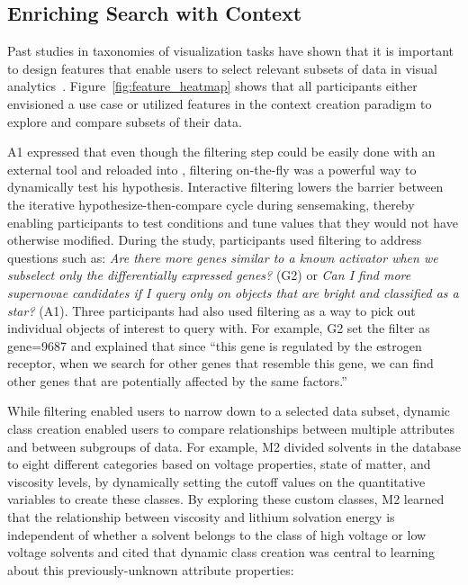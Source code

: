 \subsection{Enriching Search with Context}
\par Past studies in taxonomies of visualization tasks have shown that it is important to design features that enable users to select relevant subsets of data in visual analytics~\cite{Amar2005,Heer2012}. %
Figure~\ref{fig:feature_heatmap} shows that all participants either envisioned a use case or utilized features in the context creation paradigm to explore and compare subsets of their data.
\par A1 expressed that even though the filtering step could be easily done with an external tool and reloaded into \zv, filtering on-the-fly was a powerful way to dynamically test his hypothesis. Interactive filtering lowers the barrier between the iterative hypothesize-then-compare cycle during sensemaking, thereby enabling participants to test conditions and tune values that they would not have otherwise modified.
During the study, participants used filtering to address questions such as: \textit{Are there more genes similar to a known activator when we subselect only the differentially expressed genes?} (G2) or \textit{Can I find more supernovae candidates if I query only on objects that are bright and classified as a star?} (A1). Three participants had also used filtering as a way to pick out individual objects of interest to query with. For example, G2 set the filter as gene=9687 and explained that since ``this gene is regulated by the estrogen receptor, when we search for other genes that resemble this gene, we can find other genes that are potentially affected by the same factors.''
\par While filtering enabled users to narrow down to a selected data subset, dynamic class creation enabled users to compare relationships between multiple attributes and between subgroups of data. For example, M2 divided solvents in the database to eight different categories based on voltage properties, state of matter, and viscosity levels, by dynamically setting the cutoff values on the quantitative variables to create these classes. By exploring these custom classes, M2 learned that the relationship between viscosity and lithium solvation energy is independent of whether a solvent belongs to the class of high voltage or low voltage solvents and cited that dynamic class creation was central to learning about this previously-unknown attribute properties:
